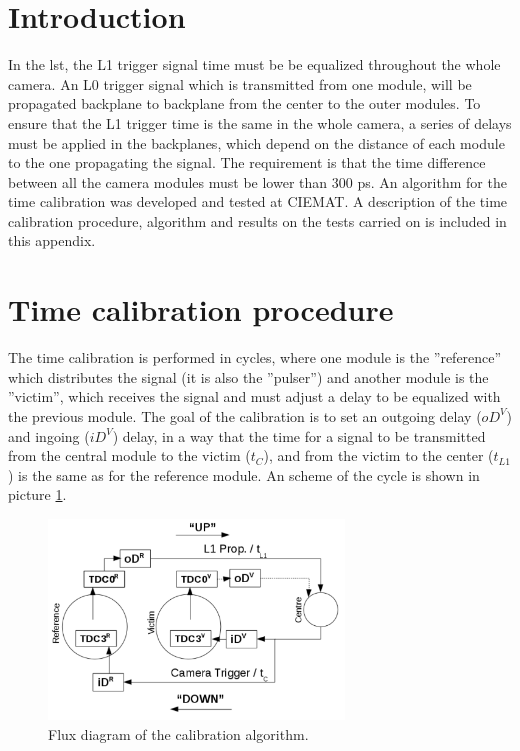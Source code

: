 \documentclass[main.tex]{subfiles}
\begin{document}
\glsresetall

\section{Introduction}

In the \gls{lst}, the L1 trigger signal time must be be equalized throughout the whole camera. An L0 trigger signal which is transmitted from one module, will be propagated backplane to backplane from the center to the outer modules. To ensure that the L1 trigger time is the same in the whole camera, a series of delays must be applied in the backplanes, which depend on the distance of each module to the one propagating the signal. The requirement is that the time difference between all the camera modules must be lower than 300 ps. An algorithm for the time calibration was developed and tested at CIEMAT. A description of the time calibration procedure, algorithm and results on the tests carried on is included in this appendix.

\section{Time calibration procedure}

The time calibration is performed in cycles, where one module is the ''reference'' which distributes the signal (it is also the ''pulser'') and another module is the ''victim'', which receives the signal and must adjust a delay to be equalized with the previous module. The goal of the calibration is to set an outgoing delay ($oD^{V}$) and ingoing ($iD^{V}$) delay, in a way that the time for a signal to be transmitted from the central module to the victim ($t_{C}$), and from the victim to the center ($t_{L1}$) is the same as for the reference module. An scheme of the cycle is shown in picture \ref{fig:calibcicle}. 

\begin{figure}[h]
  \centering
  \includegraphics[width=0.7\textwidth]{./Pictures/timecalib.pdf}
  \caption{Flux diagram of the calibration algorithm.}
  \label{fig:calibcicle}
\end{figure}
\end{document}
